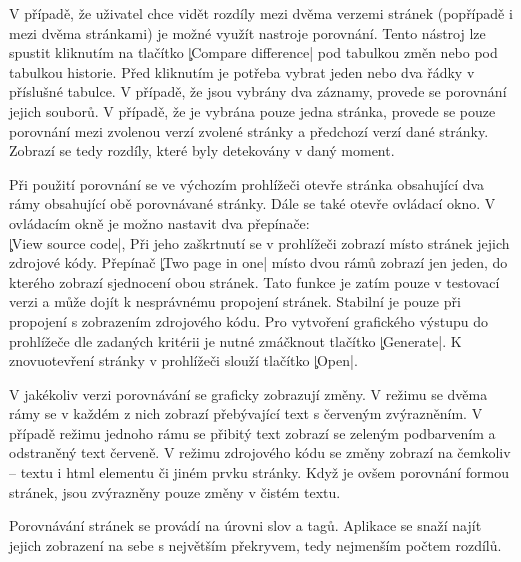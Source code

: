 V případě, že uživatel chce vidět rozdíly mezi dvěma verzemi stránek (popřípadě i mezi dvěma stránkami) je možné využít nastroje porovnání.
Tento nástroj lze spustit kliknutím na tlačítko \c|Compare difference| pod tabulkou změn nebo pod tabulkou historie.
Před kliknutím je potřeba vybrat jeden nebo dva řádky v příslušné tabulce.
V případě, že jsou vybrány dva záznamy, provede se porovnání jejich souborů.
V případě, že je vybrána pouze jedna stránka, provede se pouze porovnání mezi zvolenou verzí zvolené stránky a předchozí verzí dané stránky.
Zobrazí se tedy rozdíly, které byly detekovány v daný moment.

Při použití porovnání se ve výchozím prohlížeči otevře stránka obsahující dva rámy obsahující obě porovnávané stránky.
Dále se také otevře ovládací okno.
V ovládacím okně je možno nastavit dva přepínače:\\
\c|View source code|, Při jeho zaškrtnutí se v prohlížeči zobrazí místo stránek jejich zdrojové kódy.
Přepínač \c|Two page in one| místo dvou rámů zobrazí jen jeden, do kterého zobrazí sjednocení obou stránek.
Tato funkce je zatím pouze v testovací verzi a může dojít k nesprávnému propojení stránek. Stabilní je pouze při propojení s zobrazením zdrojového kódu.
Pro vytvoření grafického výstupu do prohlížeče dle zadaných kritérii je nutné zmáčknout tlačítko \c|Generate|.
K znovuotevření stránky v prohlížeči slouží tlačítko \c|Open|.

V jakékoliv verzi porovnávání se graficky zobrazují změny.
V režimu se dvěma rámy se v každém z nich zobrazí přebývající text s červeným zvýrazněním.
V případě režimu jednoho rámu se přibitý text zobrazí se zeleným podbarvením a odstraněný text červeně.
V režimu zdrojového kódu se změny zobrazí na čemkoliv -- textu i html elementu či jiném prvku stránky.
Když je ovšem porovnání formou stránek, jsou zvýrazněny pouze změny v čistém textu.

Porovnávání stránek se provádí na úrovni slov a tagů.
Aplikace se snaží najít jejich zobrazení na sebe s největším překryvem,  tedy nejmenším počtem rozdílů.
